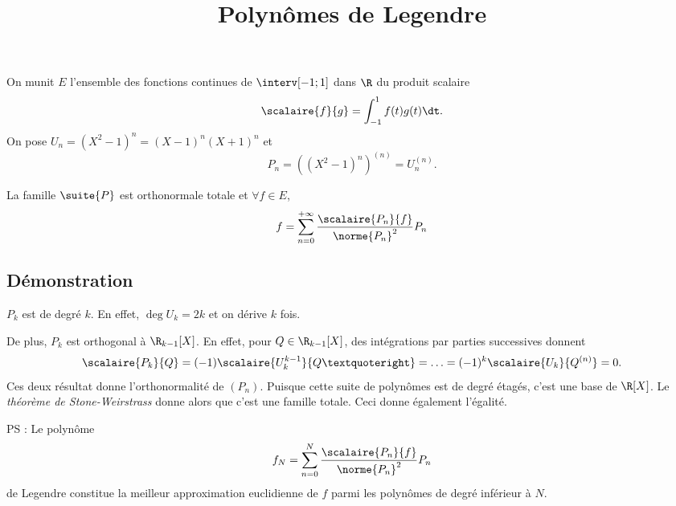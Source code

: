 \documentclass[fontsize=12pt,twoside=false,parskip=half, french]{scrartcl}
\title{Polynômes de Legendre}
\date{}
\author{}
\begin{document}
\maketitle
   On munit $E$ l’ensemble des fonctions continues de $\interv[-1; 1]$ dans $\R$ du produit scalaire
   \[
      \scalaire{f}{g} = \int_{-1}^1 f(t)g(t) \dt.
   \]
   On pose $U_n = (X^2 - 1)^n = (X - 1)^n(X + 1)^n$ et
   \[
      P_n = ((X^2 - 1)^n)^{(n)} = U_n^{(n)}.
   \]
   \begin{Theoreme}
      La famille $\suite{P}$ est orthonormale totale et $\forall f \in E$,
      \[
         f = \sum_{n = 0}^{+\infty} \frac{\scalaire{P_n}{f}}{\norme{P_n}^2}P_n
      \]
   \end{Theoreme}
   \subsection{Démonstration}
      $P_k$ est de degré $k$. En effet, $\deg U_k = 2k$ et on dérive $k$ fois.

      De plus, $P_k$ est orthogonal à $\R_{k - 1}[X]$. En effet, pour
      $Q \in \R_{k - 1}[X]$, des intégrations par parties successives donnent
      \[
         \scalaire{P_k}{Q} = (-1)\scalaire{U_k^{k - 1}}{Q’} = \ldots = (-1)^k\scalaire{U_k}{Q^{(n)}} = 0.
      \]
      Ces deux résultat donne l’orthonormalité de $(P_n)$. Puisque cette suite
      de polynômes est de degré étagés, c’est une base de $\R[X]$. Le
      \emph{théorème de Stone-Weirstrass} donne alors que c’est une famille totale.
      Ceci donne également l’égalité.

      PS : Le polynôme
         \[
            f_N = \sum_{n = 0}^{N} \frac{\scalaire{P_n}{f}}{\norme{P_n}^2}P_n
         \]de Legendre constitue la meilleur approximation euclidienne
           de $f$ parmi les polynômes de degré inférieur à $N$.
\end{document}

